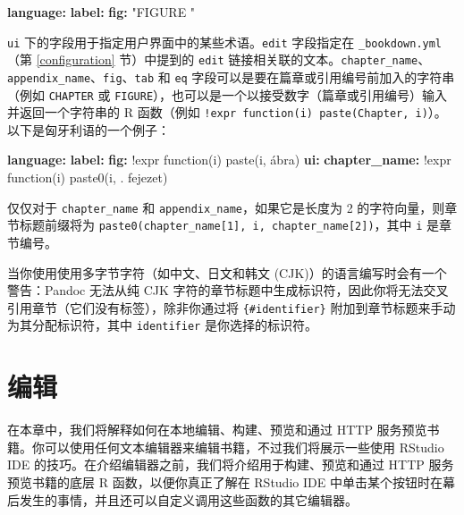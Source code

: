 \documentclass[
  12pt,
]{krantz}
\newenvironment{Shaded}{\begin{snugshade}}{\end{snugshade}}
\newcommand{\AttributeTok}[1]{\textcolor[rgb]{0.13,0.29,0.53}{#1}}
\newcommand{\FunctionTok}[1]{\textcolor[rgb]{0.13,0.29,0.53}{\textbf{#1}}}
\newcommand{\KeywordTok}[1]{\textcolor[rgb]{0.13,0.29,0.53}{\textbf{#1}}}
\newcommand{\StringTok}[1]{\textcolor[rgb]{0.31,0.60,0.02}{#1}}
\theoremstyle{definition}
\theoremstyle{definition}
\theoremstyle{definition}
\theoremstyle{definition}
\theoremstyle{remark}
\begin{document}
\begin{Shaded}
\begin{Highlighting}[]
\FunctionTok{language}\KeywordTok{:}
\AttributeTok{  }\FunctionTok{label}\KeywordTok{:}
\AttributeTok{    }\FunctionTok{fig}\KeywordTok{:}\AttributeTok{ }\StringTok{"FIGURE "}
\end{Highlighting}
\end{Shaded}

\texttt{ui} 下的字段用于指定用户界面中的某些术语。\texttt{edit} 字段指定在 \texttt{\_bookdown.yml}（第 \ref{configuration} 节）中提到的 \texttt{edit} 链接相关联的文本。\texttt{chapter\_name}、\texttt{appendix\_name}、\texttt{fig}、\texttt{tab} 和 \texttt{eq} 字段可以是要在篇章或引用编号前加入的字符串（例如 \texttt{CHAPTER} 或 \texttt{FIGURE}），也可以是一个以接受数字（篇章或引用编号）输入并返回一个字符串的 R 函数（例如 \texttt{!expr\ function(i)\ paste(\textquotesingle{}Chapter\textquotesingle{},\ i)}）。以下是匈牙利语的一个例子：

\begin{Shaded}
\begin{Highlighting}[]
\FunctionTok{language}\KeywordTok{:}
\AttributeTok{  }\FunctionTok{label}\KeywordTok{:}
\AttributeTok{    }\FunctionTok{fig}\KeywordTok{:}\AttributeTok{ !expr function(i) paste(i, \textquotesingle{}ábra\textquotesingle{})}
\AttributeTok{  }\FunctionTok{ui}\KeywordTok{:}
\AttributeTok{    }\FunctionTok{chapter\_name}\KeywordTok{:}\AttributeTok{ !expr function(i) paste0(i, \textquotesingle{}. fejezet\textquotesingle{})}
\end{Highlighting}
\end{Shaded}

仅仅对于 \texttt{chapter\_name} 和 \texttt{appendix\_name}，如果它是长度为 2 的字符向量，则章节标题前缀将为 \texttt{paste0(chapter\_name{[}1{]},\ i,\ chapter\_name{[}2{]})}，其中 \texttt{i} 是章节编号。

当你使用使用多字节字符（如中文、日文和韩文 (CJK)）的语言编写时会有一个警告：Pandoc 无法从纯 CJK 字符的章节标题中生成标识符，因此你将无法交叉引用章节（它们没有标签），除非你通过将 \texttt{\{\#identifier\}} 附加到章节标题来手动为其分配标识符，其中 \texttt{identifier} 是你选择的标识符。

\chapter{编辑}\label{editing}

在本章中，我们将解释如何在本地编辑、构建、预览和通过 HTTP 服务预览书籍。你可以使用任何文本编辑器来编辑书籍，不过我们将展示一些使用 RStudio IDE 的技巧。在介绍编辑器之前，我们将介绍用于构建、预览和通过 HTTP 服务预览书籍的底层 R 函数，以便你真正了解在 RStudio IDE 中单击某个按钮时在幕后发生的事情，并且还可以自定义调用这些函数的其它编辑器。
\end{document}
